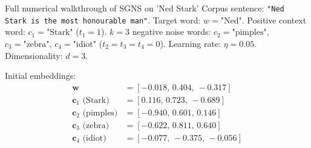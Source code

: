 \documentclass[a4paper,11pt]{article}
\begin{document}
\begin{worked}{Full numerical walkthrough of SGNS on 'Ned Stark'}
Corpus sentence: \texttt{"Ned Stark is the most honourable man"}.
Target word: $w = \text{"Ned"}$.
Positive context word: $c_1 = \text{"Stark"}$ ($t_1 = 1$).
$k = 3$ negative noise words: $c_2 = \text{"pimples"}$, $c_3 = \text{"zebra"}$, $c_4 = \text{"idiot"}$ ($t_2 = t_3 = t_4 = 0$).
Learning rate: $\eta = 0.05$.
Dimensionality: $d = 3$.

Initial embeddings:
\begin{align*}
\mathbf{w} &= [-0.018,\, 0.404,\, -0.317] \\
\mathbf{c}_1 \text{ (Stark)} &= [0.116,\, 0.723,\, -0.689] \\
\mathbf{c}_2 \text{ (pimples)} &= [-0.940,\, 0.601,\, 0.146] \\
\mathbf{c}_3 \text{ (zebra)} &= [-0.622,\, 0.811,\, 0.640] \\
\mathbf{c}_4 \text{ (idiot)} &= [-0.077,\, -0.375,\, -0.056]
\end{align*}


\end{worked}
\end{document}
